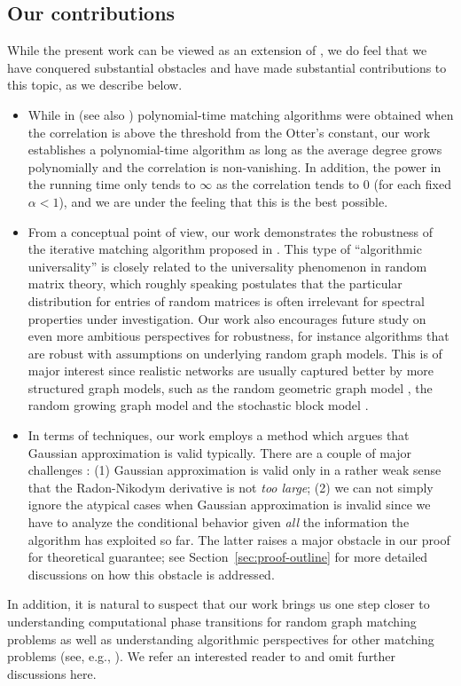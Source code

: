 \documentclass[11pt]{article}
\numberwithin{equation}{section}
\begin{document}
\subsection{Our contributions}
While the present work can be viewed as an extension of \cite{DL22+}, we do feel that we have conquered substantial obstacles and have made substantial contributions to this topic, as we describe below. 
\begin{itemize}
\item While in \cite{MWXY22+} (see also \cite{GMS22+}) polynomial-time matching algorithms were obtained when the correlation is above the threshold from the Otter's constant, our work establishes a polynomial-time algorithm as long as the average degree grows polynomially and the correlation is non-vanishing. In addition, the power in the running time only tends to $\infty$ as the correlation tends to $0$ (for each fixed $\alpha<1$), and we are under the feeling that this is the best possible.
\item From a conceptual point of view, our work demonstrates the robustness of the iterative matching algorithm proposed in \cite{DL22+}. This type of ``algorithmic universality'' is closely related to the universality phenomenon in random matrix theory, which roughly speaking postulates that the particular distribution for entries  of random matrices is often irrelevant for spectral properties under investigation. Our work also encourages future study on even more ambitious perspectives for robustness, for instance algorithms that are robust with assumptions on underlying random graph models. This is of major interest since realistic networks are usually captured better by more structured graph models, such as the random geometric graph model \cite{WWXY22+}, the random growing graph model \cite{RS20+} and the stochastic block model \cite{RS21}. 
\item In terms of techniques, our work employs a method which argues that Gaussian approximation is valid typically. There are a couple of major challenges : (1) Gaussian approximation is valid only in a rather weak sense that the Radon-Nikodym derivative is not \emph{too large}; (2) we can not simply ignore the atypical cases when Gaussian approximation is invalid since we have to analyze the conditional behavior given \emph{all} the information the algorithm has exploited so far. The latter raises a major obstacle in our proof for theoretical guarantee; see Section~\ref{sec:proof-outline} for more detailed discussions on how this obstacle is addressed. 
\end{itemize}
In addition, it is natural to suspect that our work brings us one step closer to understanding computational phase transitions for random graph matching problems as well as understanding algorithmic perspectives for other matching problems (see, e.g., \cite{CJMNZ22+}). We refer an interested reader to \cite[Section 1.3]{DL22+} and omit further discussions here.
\end{document}
